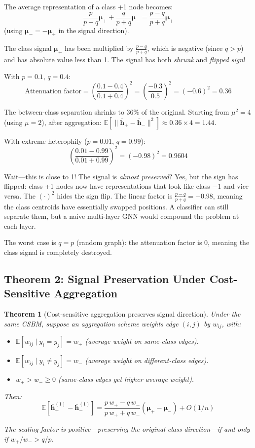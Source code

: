 \documentclass[11pt,a4paper]{article}
\newcommand{\E}{\mathbb{E}}
\newcommand{\bh}{\mathbf{h}}
\theoremstyle{definition}
\theoremstyle{plain}
\newtheorem{theorem}{Theorem}[section]
\begin{document}
The average representation of a class +1 node becomes:
\[
  \frac{p}{p+q}\boldsymbol{\mu}_+ + \frac{q}{p+q}\boldsymbol{\mu}_-
  = \frac{p-q}{p+q}\boldsymbol{\mu}_+
\]
(using $\boldsymbol{\mu}_- = -\boldsymbol{\mu}_+$ in the signal direction).

The class signal $\boldsymbol{\mu}_+$ has been multiplied by
$\frac{p-q}{p+q}$, which is negative (since $q > p$) and has absolute value less
than 1.
The signal has both \emph{shrunk} and \emph{flipped sign}!

\begin{example}
With $p = 0.1$, $q = 0.4$:
\[
  \text{Attenuation factor} = \left(\frac{0.1 - 0.4}{0.1 + 0.4}\right)^2
  = \left(\frac{-0.3}{0.5}\right)^2 = (-0.6)^2 = 0.36
\]

The between-class separation shrinks to 36\% of the original.
Starting from $\mu^2 = 4$ (using $\mu = 2$), after aggregation:
$\E[\|\bar{\bh}_+ - \bar{\bh}_-\|^2] \approx 0.36 \times 4 = 1.44$.

With extreme heterophily ($p = 0.01$, $q = 0.99$):
\[
  \left(\frac{0.01 - 0.99}{0.01 + 0.99}\right)^2 = (-0.98)^2 = 0.9604
\]

Wait---this is close to 1! The signal is \emph{almost preserved}?
Yes, but the sign has flipped: class +1 nodes now have representations that
look like class $-1$ and vice versa. The $(\cdot)^2$ hides the sign flip.
The linear factor is $\frac{p-q}{p+q} = -0.98$, meaning the class centroids
have essentially swapped positions.
A classifier can still separate them, but a naive multi-layer GNN would compound
the problem at each layer.

The worst case is $q = p$ (random graph): the attenuation factor is 0,
meaning the class signal is completely destroyed.
\end{example}


\subsection{Theorem 2: Signal Preservation Under Cost-Sensitive Aggregation}
\label{sec:theorem2}

\begin{theorem}[Cost-sensitive aggregation preserves signal direction]
Under the same CSBM, suppose an aggregation scheme weights edge $(i,j)$ by $w_{ij}$,
with:
\begin{itemize}[nosep]
  \item $\E[w_{ij} \mid y_i = y_j] = w_+$ (average weight on same-class edges).
  \item $\E[w_{ij} \mid y_i \neq y_j] = w_-$ (average weight on different-class edges).
  \item $w_+ > w_- \geq 0$ (same-class edges get higher average weight).
\end{itemize}
Then:
\begin{equation}
  \E[\bar{\bh}_+^{(1)} - \bar{\bh}_-^{(1)}]
  = \frac{p\, w_+ - q\, w_-}{p\, w_+ + q\, w_-}(\boldsymbol{\mu}_+ - \boldsymbol{\mu}_-) + O(1/n)
  \tag{Eq.~11, Thm.~2}
\end{equation}

The scaling factor is positive---preserving the original class direction---if and only if $w_+/w_- > q/p$.
\end{theorem}
\end{document}
